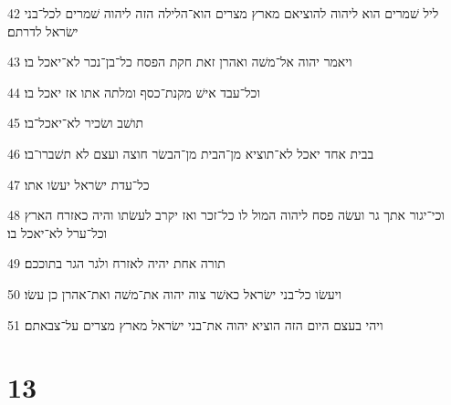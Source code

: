 \par 42 ליל שׁמרים הוא ליהוה להוציאם מארץ מצרים הוא־הלילה הזה ליהוה שׁמרים לכל־בני ישׂראל לדרתם׃
\par 43 ויאמר יהוה אל־משׁה ואהרן זאת חקת הפסח כל־בן־נכר לא־יאכל בו׃
\par 44 וכל־עבד אישׁ מקנת־כסף ומלתה אתו אז יאכל בו׃
\par 45 תושׁב ושׂכיר לא־יאכל־בו׃
\par 46 בבית אחד יאכל לא־תוציא מן־הבית מן־הבשׂר חוצה ועצם לא תשׁברו־בו׃
\par 47 כל־עדת ישׂראל יעשׂו אתו׃
\par 48 וכי־יגור אתך גר ועשׂה פסח ליהוה המול לו כל־זכר ואז יקרב לעשׂתו והיה כאזרח הארץ וכל־ערל לא־יאכל בו׃
\par 49 תורה אחת יהיה לאזרח ולגר הגר בתוככם׃
\par 50 ויעשׂו כל־בני ישׂראל כאשׁר צוה יהוה את־משׁה ואת־אהרן כן עשׂו׃
\par 51 ויהי בעצם היום הזה הוציא יהוה את־בני ישׂראל מארץ מצרים על־צבאתם׃

\chapter{13}

